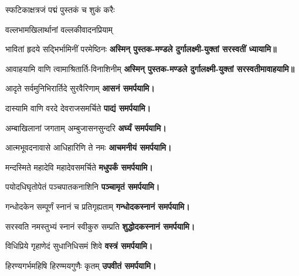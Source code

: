 \begin{center}

{स्फटिकाक्षत्रजं पद्मं पुस्तकं च शुकं करैः}

{वल्लभामखिलार्थानां वल्लकीवादनप्रियाम्}

{भावितां हृदये सद्भिर्भामिनीं परमेष्ठिनः}
\textbf{अस्मिन् पुस्तक-मण्डले दुर्गालक्ष्मी-युक्तां सरस्वतीं ध्यायामि॥}
\medskip

{आवाहयामि वाणि त्वामाश्रितार्ति-विनाशिनीम्}
\textbf{अस्मिन् पुस्तक-मण्डले दुर्गालक्ष्मी-युक्तां सरस्वतीमावाहयामि॥}
\medskip

{आदृते सर्वमुनिभिरार्तिदे सुरवैरिणाम् }
\textbf{\devAya{} आसनं समर्पयामि।}
\medskip

{दास्यामि वाणि वरदे देवराजसमर्चिते}
\textbf{\devAya{} पाद्यं समर्पयामि।}
\medskip

{अम्बाखिलानां जगताम् अम्बुजासनसुन्दरि}
\textbf{\devAya{} अर्घ्यं समर्पयामि।}
\medskip

{आत्मभूवदनावासे आधिहारिणि ते नमः}
\textbf{\devAya{} आचमनीयं समर्पयामि।}
\medskip

{मन्दस्मिते महादेवि महादेवसमर्चिते}
\textbf{\devAya{} मधुपर्कं समर्पयामि।}
\medskip

{पयोदधिघृतोपेतं पञ्चपातकनाशिनि}
\textbf{\devAya{} पञ्चामृतं समर्पयामि।}
\medskip

{गन्धोदकेन सम्पूर्णं स्नानं च प्रतिगृह्यताम्}
\textbf{\devAya{} गन्धोदकस्नानं समर्पयामि।}
\medskip

{सरस्वति नमस्तुभ्यं स्नानं स्वीकुरु सम्प्रति}
\textbf{\devAya{} शुद्धोदकस्नानं समर्पयामि।}
\medskip

{विधिप्रिये गृहाणेदं सुधानिधिसमं शिवे}
\textbf{\devAya{} वस्त्रं समर्पयामि।}
\medskip

{हिरण्यगर्भमहिषि हिरण्मयगुणैः कृतम्}
\textbf{\devAya{} उपवीतं समर्पयामि।}
\medskip


\end{center}
